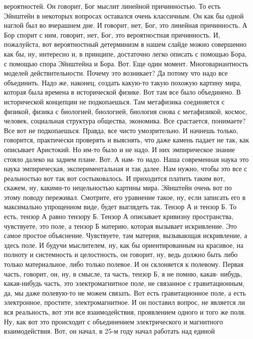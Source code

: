вероятностей. Он говорит, Бог мыслит линейной причинностью. То есть Эйнштейн в
некоторых вопросах оставался очень классичным. Он как бы одной наглой был во
вчерашнем дне. И говорит, нет, Бог, это линейная причинность. А Бор спорит с
ним, говорит, нет, Бог, это вероятностная причинность. И, пожалуйста, вот
вероятностный детерминизм в нашем слайде можно совершенно как бы, ну, интересно
и, в принципе, достаточно легко описать с помощью Бора, с помощью спора
Эйнштейна и Бора. Вот. Еще один момент. Многовариантность моделей
действительности. Почему это возникает? Да потому что надо все объединить. Надо
же, наконец, создать какую-то такую похожую картину мира, которая была времена в
исторической физике. Вот там все было объединено. В исторической концепции не
подкопаешься. Там метафизика соединяется с физикой, физика с биологией,
биологией, биология снова с метафизикой, космос, человек, социальная структура
общества, экономика. Все срастается, понимаете? Все вот не подкопаешься. Правда,
все чисто умозрительно. И начнешь только, говорится, практически проверять и
выяснять, что даже камень падает не так, как описывает Аристокий. Но им-то было
и не надо. И них эмпирическое знание стояло далеко на заднем плане. Вот. А нам-
то надо. Наша современная наука это наука эмпирическая, экспериментальная и так
далее. Нам нужно, чтобы это все с реальностью вот так вот состыковалось. И
приходится платить таким вот, скажем, ну, какими-то нецельностью картины мира.
Эйнштейн очень вот по этому поводу переживал. Смотрите, его уравнение такое, ну,
если записать его в максимально упрощенном виде, будет выглядеть так. Тензор А и
тензор Б. То есть, тензор А равно тензору Б. Тензор А описывает кривизну
пространства, чувствуете, это поле, а тензор Б материю, которая вызывает
искривление. Это самое простое объяснение. Чувствуете, там материя, вызывающая
искривление, а здесь поле. И будучи мыслителем, ну, как бы ориентированным на
красивое, на полноту и системность и целостность, он говорит, ну, ведь должно
быть либо только материальное, либо только полевое. И он склоняется к полевому.
Первая часть, говорит, он, ну, в смысле, та часть, тензор Б, я не помню, какая-
нибудь, какая-нибудь часть, это электромагнитное поле, не связанное с
гравитационным, да, мы даже полевую-то не можем связать. Вот есть гравитационное
поле, а есть электронное, простите, электромагнитное. И он поставил вопрос, не
является ли вся реальность, вот эти все взаимодействия, проявлением одного и
того же поля. Ну, как вот это происходит с объединением электрического и
магнитного взаимодействия. Вот, он начал, в 25-м году начал работать над единой
